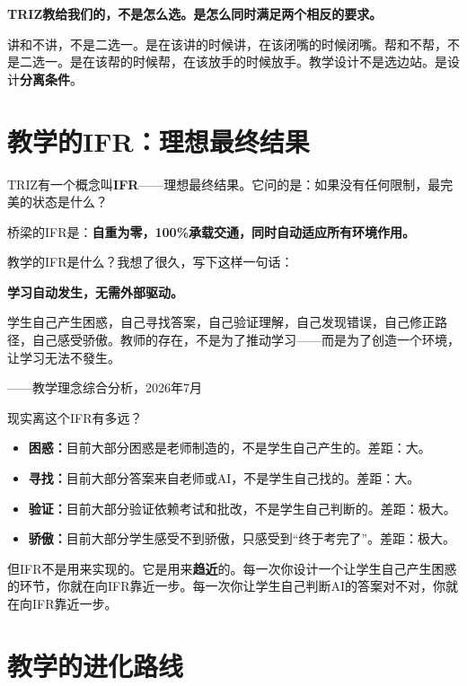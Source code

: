 \begin{insight}
\label{insight:chap13}

\textbf{TRIZ教给我们的，不是怎么选。是怎么同时满足两个相反的要求。}

讲和不讲，不是二选一。是在该讲的时候讲，在该闭嘴的时候闭嘴。帮和不帮，不是二选一。是在该帮的时候帮，在该放手的时候放手。教学设计不是选边站。是设计\textbf{分离条件}。
\end{insight}

\section{教学的IFR：理想最终结果}

TRIZ有一个概念叫\textbf{IFR}——理想最终结果。它问的是：如果没有任何限制，最完美的状态是什么？

桥梁的IFR是：\textbf{自重为零，100\%承载交通，同时自动适应所有环境作用。}

教学的IFR是什么？我想了很久，写下这样一句话：

\begin{shiyu-inline}
\textbf{学习自动发生，无需外部驱动。}

学生自己产生困惑，自己寻找答案，自己验证理解，自己发现错误，自己修正路径，自己感受骄傲。教师的存在，不是为了推动学习——而是为了创造一个环境，让学习无法不發生。

\hfill ——教学理念综合分析，2026年7月
\end{shiyu-inline}

现实离这个IFR有多远？

\begin{itemize}
  \item \textbf{困惑：}目前大部分困惑是老师制造的，不是学生自己产生的。差距：大。
  \item \textbf{寻找：}目前大部分答案来自老师或AI，不是学生自己找的。差距：大。
  \item \textbf{验证：}目前大部分验证依赖考试和批改，不是学生自己判断的。差距：极大。
  \item \textbf{骄傲：}目前大部分学生感受不到骄傲，只感受到``终于考完了''。差距：极大。
\end{itemize}

但IFR不是用来实现的。它是用来\textbf{趋近}的。每一次你设计一个让学生自己产生困惑的环节，你就在向IFR靠近一步。每一次你让学生自己判断AI的答案对不对，你就在向IFR靠近一步。

\section{教学的进化路线}

